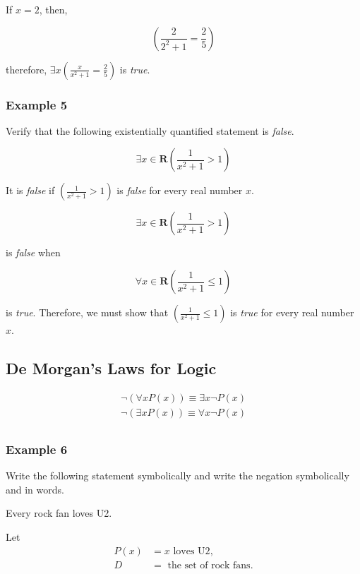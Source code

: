 If $x = 2$, then,

\[
    \left( \frac{2}{2^2 + 1} = \frac{2}{5} \right)
\]

therefore, $\exists x \left( \frac{x}{x^2 + 1} = \frac{2}{5} \right)$ is \textit{true}.

\subsubsection*{Example 5}

Verify that the following existentially quantified statement is \textit{false}.

\[
    \exists x \in \textbf{R} \left( \frac{1}{x^2 + 1} > 1 \right)
\]

It is \textit{false} if $\left( \frac{1}{x^2 + 1} > 1 \right)$ is \textit{false} for every real number $x$.

\[
    \exists x \in \textbf{R} \left( \frac{1}{x^2 + 1} > 1 \right)
\]

is \textit{false} when

\[
    \forall x \in \textbf{R} \left( \frac{1}{x^2 + 1} \leq 1 \right)
\]

is \textit{true}.  Therefore, we must show that $\left( \frac{1}{x^2 + 1} \leq 1 \right)$ is \textit{true} for every real number $x$.

\subsection*{De Morgan's Laws for Logic}

\begin{align*}
    \lnot(\forall x P(x)) \equiv \exists x \lnot P(x)\\
    \lnot(\exists x P(x)) \equiv \forall x \lnot P(x)\\
\end{align*}

\subsubsection{Example 6}

Write the following statement symbolically and write the negation symbolically and in words.
\begin{center}
    Every rock fan loves U2.
\end{center}

Let
\begin{align*}
    P(x) &= x \text{ loves U2},\\
    D &= \text{ the set of rock fans}.
\end{align*}

